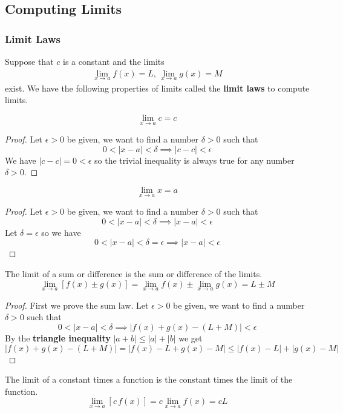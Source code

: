 \subsection{Computing Limits}

\subsubsection{Limit Laws}
Suppose that \(c\) is a constant and the limits
\begin{gather*}
    \lim_{x\to a}f(x)=L,\,\lim_{x\to a}g(x)=M
\end{gather*}
exist.
We have the following properties of limits called the \textbf{limit laws} to
compute limits.
\begin{theorem}
    \[\lim_{x\to a}c=c\]
\end{theorem}
\begin{proof}
    Let \(\epsilon>0\) be given, we want to find a number \(\delta>0\) such
    that \[0<|x-a|<\delta\implies|c-c|<\epsilon\]
    We have \(|c-c|=0<\epsilon\) so the trivial inequality is always true for
    any number \(\delta>0\).
\end{proof}
\begin{theorem}
    \[\lim_{x\to a}x=a\]
\end{theorem}
\begin{proof}
    Let \(\epsilon>0\) be given, we want to find a number \(\delta>0\) such
    that \[0<|x-a|<\delta\implies|x-a|<\epsilon\]
    Let \(\delta=\epsilon\) so we have
    \[0<|x-a|<\delta=\epsilon\implies|x-a|<\epsilon\]
\end{proof}
\begin{theorem}
    The limit of a sum or difference is the sum or difference of the limits.
    \[\lim_{x\to a}[f(x)\pm g(x)]=\lim_{x\to a}f(x)\pm\lim_{x\to a}g(x)=L\pm M\]
\end{theorem}
\begin{proof}
    First we prove the sum law.
    Let \(\epsilon>0\) be given, we want to find a number \(\delta>0\) such
    that \[0<|x-a|<\delta\implies|f(x)+g(x)-(L+M)|<\epsilon\]
    By the \textbf{triangle inequality} \(|a+b|\leq|a|+|b|\) we get
    \[|f(x)+g(x)-(L+M)|=|f(x)-L+g(x)-M|\leq|f(x)-L|+|g(x)-M|\]
\end{proof}
\begin{theorem}
    The limit of a constant times a function is the constant times the limit
    of the function.
    \[\lim_{x\to a}[c\,f(x)]=c\lim_{x\to a}f(x)=cL\]
\end{theorem}
